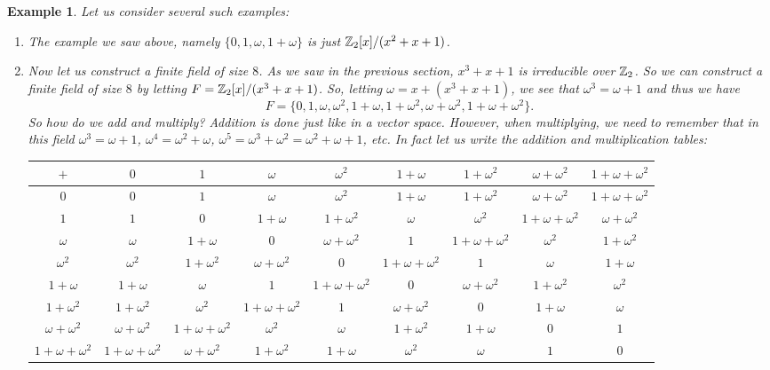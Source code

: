 \documentclass[12pt]{article}
\theoremstyle{plain}
\newtheorem{example}{Example}
\theoremstyle{definition}
\theoremstyle{remark}
\begin{document}
\begin{example}
Let us consider several such examples:
\begin{enumerate}
    \item The example we saw above, namely $\{0,1,\omega, 1+\omega\}$ is just $\mathbb{Z}_2[x]/(x^2+x+1)$.
    \item Now let us construct a finite field of size $8$. As we saw in the previous section, $x^3+x+1$ is irreducible over $\mathbb{Z}_2$. So we can construct a finite field of size $8$ by letting $F= \mathbb{Z}_2[x]/(x^3+x+1)$.
    So, letting $\omega = x+(x^3+x+1)$, we see that $\omega^3=\omega+1$ and thus we have
    $$F = \{0,1, \omega, \omega ^2, 1+\omega, 1+\omega^2, \omega+\omega^2, 1+\omega+\omega^2\}.$$ So how do we add and multiply? Addition is done just like in a vector space. However, when multiplying, we need to remember that in this field $\omega^3=\omega+1$, $\omega^4=\omega^2+\omega$, $\omega^5 = \omega^3+\omega^2= \omega^2+\omega+1$, etc.  In fact let us write the addition and multiplication tables:


\begin{table}[H]
\footnotesize{
\begin{tabular}{ c| c | c |c|c|c|c|c|c}
$+$  & $0$ & $1$ & $\omega$ & $\omega^2$ & $1+\omega$ & $1+\omega^2$ & $\omega+\omega^2$ & $1+\omega+\omega^2$ \\
\hline
$0$ &$0$ & $1$ & $\omega$ & $\omega^2$ & $1+\omega$ & $1+\omega^2$ & $\omega+\omega^2$ & $1+\omega+\omega^2$   \\
\hline
$1$ & $1$ & $0$ & $1+\omega$ & $1+\omega^2$ & $\omega$ & $\omega^2$ & $1+\omega+\omega^2$ & $\omega+\omega^2$  \\
\hline
$\omega$ & $\omega$ & $1+\omega$ & $0$ & $\omega+\omega^2$  & $1$ & $1+\omega+\omega^2$ & $\omega^2$ & $1+\omega^2$\\
\hline
$\omega^2$ & $\omega^2$& $1+\omega^2$ & $\omega+\omega^2$&$0$ & $1+\omega+\omega^2$ &$1$& $\omega$ & $ 1+\omega$\\
\hline
$1+\omega$ & $1+\omega$& $\omega$ & $1$&$1+\omega+\omega^2$ & $0$ &$\omega+\omega^2$& $1+\omega^2$ & $\omega^2$\\
\hline
$1+\omega^2$ & $1+\omega^2$& $\omega^2$&$1+\omega+\omega^2$ & $1$&$\omega+\omega^2$ &$0$& $1+\omega$ & $\omega$\\
\hline
$\omega+\omega^2$ & $\omega+\omega^2$&$1+\omega+\omega^2$& $\omega^2$&$\omega$ & $1+\omega^2$&$1+\omega$ &$0$& $1$\\
\hline
$1+\omega+\omega^2$ & $1+\omega+\omega^2$&$\omega+\omega^2$& $1+\omega^2$&$1+\omega$ & $\omega^2$&$\omega$ &$1$& $0$\\


\end{tabular}}
\end{table}
\end{enumerate}
\end{example}
\end{document}
